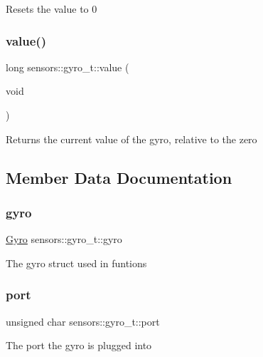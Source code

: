Resets the value to 0 \mbox{\label{classsensors_1_1gyro__t_acfab48fd9d83607a599e73f054f04c0e}} 
\subsubsection{\texorpdfstring{value()}{value()}}
{\footnotesize\ttfamily long sensors\+::gyro\+\_\+t\+::value (\begin{DoxyParamCaption}\item[{void}]{ }\end{DoxyParamCaption})}

Returns the current value of the gyro, relative to the zero 

\subsection{Member Data Documentation}
\mbox{\label{classsensors_1_1gyro__t_a6174c882a5151d0b1461408d40403c5e}} 
\subsubsection{\texorpdfstring{gyro}{gyro}}
{\footnotesize\ttfamily \hyperlink{API_8h_a04e06985633aa933343fcfa3d7fb268d}{Gyro} sensors\+::gyro\+\_\+t\+::gyro}

The gyro struct used in funtions \mbox{\label{classsensors_1_1gyro__t_aed9a64ee6944cef330bc769c606cb7e9}} 
\subsubsection{\texorpdfstring{port}{port}}
{\footnotesize\ttfamily unsigned char sensors\+::gyro\+\_\+t\+::port}

The port the gyro is plugged into \mbox{\label{classsensors_1_1gyro__t_a9367db771651c0dbdf14fac3946e8582}} 
